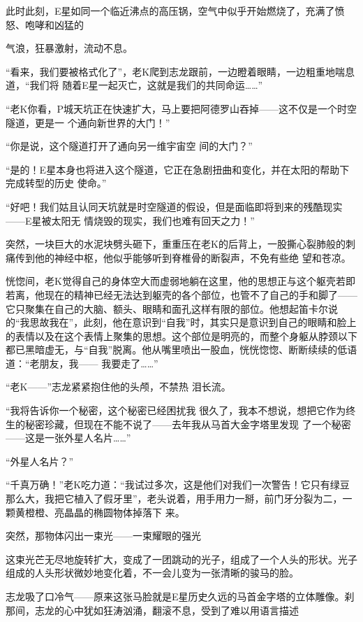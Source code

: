 \documentclass{article}
\begin{document}
此时此刻，E星如同一个临近沸点的高压锅，空气中似乎开始燃烧了，充满了愤怒、咆哮和凶猛的
\newpage

气浪，狂暴激射，流动不息。 

“看来，我们要被格式化了”，老K爬到志龙跟前，一边瞪着眼睛，一边粗重地喘息道，“我们将
随着E星一起灭亡，这就是我们的共同命运……” 

“老K你看，P城天坑正在快速扩大，马上要把阿德罗山吞掉——这不仅是一个时空隧道，更是一
个通向新世界的大门！” 

“你是说，这个隧道打开了通向另一维宇宙空
间的大门？” 

“是的！E星本身也将进入这个隧道，它正在急剧扭曲和变化，并在太阳的帮助下完成转型的历史
使命。” 

“好吧！我们姑且认同天坑就是时空隧道的假设，但是面临即将到来的残酷现实——E星被太阳无
情烧毁的现实，我们也难有回天之力！” 

\newpage

突然，一块巨大的水泥块劈头砸下，重重压在老K的后背上，一股撕心裂肺般的刺痛传到他的神经中枢，他似乎能够听到脊椎骨的断裂声，不免有些绝
望和苍凉。 

恍惚间，老K觉得自己的身体空大而虚弱地躺在这里，他的思想正与这个躯壳若即若离，他现在的精神已经无法达到躯壳的各个部位，也管不了自己的手和脚了——它只聚集在自己的大脑、额头、眼睛和面孔这样有限的部位。他想起笛卡尔说的“我思故我在”，此刻，他在意识到“自我”时，其实只是意识到自己的眼睛和脸上的表情以及在这个表情上聚集的思想。这个部位是明亮的，而整个身躯从脖颈以下都已黑暗虚无，与“自我”脱离。他从嘴里喷出一股血，恍恍惚惚、断断续续的低语道：“老朋友，我——
我要走了……” 

“老K——”志龙紧紧抱住他的头颅，不禁热
泪长流。 

“我将告诉你一个秘密，这个秘密已经困扰我
\newpage
很久了，我本不想说，想把它作为终生的秘密珍藏，但现在不能不说了——去年我从马首大金字塔里发现
了一个秘密——这是一张外星人名片……” 


“外星人名片？” 

“千真万确！”老K吃力道：“我试过多次，这是他们对我们一次警告！它只有绿豆那么大，我把它植入了假牙里”，老头说着，用手用力一掰，前门牙分裂为二，一颗黄橙橙、亮晶晶的椭圆物体掉落下
来。 

突然，那物体闪出一束光——一束耀眼的强光

这束光芒无尽地旋转扩大，变成了一团跳动的光子，组成了一个人头的形状。光子组成的人头形状微妙地变化着，不一会儿变为一张清晰的骏马的脸。

志龙吸了口冷气——原来这张马脸就是E星历史久远的马首金字塔的立体雕像。刹那间，志龙的心中犹如狂涛汹涌，翻滚不息，受到了难以用语言描述
\newpage
\end{document}
